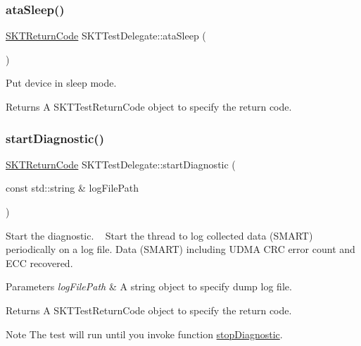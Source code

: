 \subsubsection{\texorpdfstring{ataSleep()}{ataSleep()}}
{\footnotesize\ttfamily \mbox{\hyperlink{_storage_kit_test_delegate_8h_a143844aea21c1ac420c1d0307a69deb7}{S\+K\+T\+Return\+Code}} S\+K\+T\+Test\+Delegate\+::ata\+Sleep (\begin{DoxyParamCaption}{ }\end{DoxyParamCaption})}



Put device in sleep mode. 

\begin{DoxyReturn}{Returns}
A S\+K\+T\+Test\+Return\+Code object to specify the return code. 
\end{DoxyReturn}
\mbox{\label{class_s_k_t_test_delegate_a90d0c168749430e20f9bee211adc20da}} 
\subsubsection{\texorpdfstring{startDiagnostic()}{startDiagnostic()}}
{\footnotesize\ttfamily \mbox{\hyperlink{_storage_kit_test_delegate_8h_a143844aea21c1ac420c1d0307a69deb7}{S\+K\+T\+Return\+Code}} S\+K\+T\+Test\+Delegate\+::start\+Diagnostic (\begin{DoxyParamCaption}\item[{const std\+::string \&}]{log\+File\+Path }\end{DoxyParamCaption})}



Start the diagnostic. ~\newline
Start the thread to log collected data (S\+M\+A\+RT) periodically on a log file. Data (S\+M\+A\+RT) including U\+D\+MA C\+RC error count and E\+CC recovered. 


\begin{DoxyParams}{Parameters}
{\em log\+File\+Path} & A string object to specify dump log file.\\
\hline
\end{DoxyParams}
\begin{DoxyReturn}{Returns}
A S\+K\+T\+Test\+Return\+Code object to specify the return code.
\end{DoxyReturn}
\begin{DoxyNote}{Note}
The test will run until you invoke function \mbox{\hyperlink{class_s_k_t_test_delegate_a83eb8f0f40e0ba07f93bcc2bfbe3b14f}{stop\+Diagnostic}}. 
\end{DoxyNote}
\mbox{\label{class_s_k_t_test_delegate_a83eb8f0f40e0ba07f93bcc2bfbe3b14f}} 
